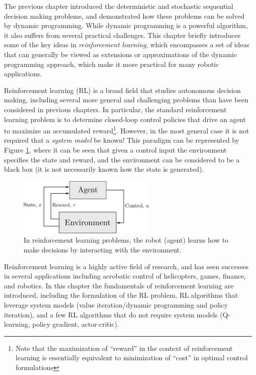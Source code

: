 The previous chapter introduced the deterministic and stochastic sequential decision making problems, and demonstrated how these problems can be solved by dynamic programming. While dynamic programming is a powerful algorithm, it also suffers from several practical challenges. This chapter briefly introduces some of the key ideas in \textit{reinforcement learning}\cite{Bertsekas2019}\cite{SuttonBarto2018}, which encompasses a set of ideas that can generally be viewed as extensions or approximations of the dynamic programming approach, which make it more practical for many robotic applications.

Reinforcement learning (RL) is a broad field that studies autonomous decision making, including several more general and challenging problems than have been considered in previous chapters. In particular, the standard reinforcement learning problem is to determine closed-loop control policies that drive an agent to maximize an accumulated reward\footnote{Note that the maximization of ``reward'' in the context of reinforcement learning is essentially equivalent to minimization of ``cost'' in optimal control formulations}. However, in the most general case it is not required that a \textit{system model} be known! This paradigm can be represented by Figure \ref{fig:rl}, where it can be seen that given a control input the environment specifies the state and reward, and the environment can be considered to be a black box (it is not necessarily known how the state is generated).
\begin{figure}[ht]
    \centering
    \includegraphics[width=0.6\textwidth]{tex/figs/ch23_figs/rl.png}
    \caption{In reinforcement learning problems, the robot (agent) learns how to make decisions by interacting with the environment.}
    \label{fig:rl}
\end{figure}


Reinforcement learning is a highly active field of research, and has seen successes in several applications including acrobatic control of helicopters, games, finance, and robotics. In this chapter the fundamentals of reinforcement learning are introduced, including the formulation of the RL problem, RL algorithms that leverage system models (value iteration/dynamic programming and policy iteration), and a few RL algorithms that do not require system models (Q-learning, policy gradient, actor-critic). 

